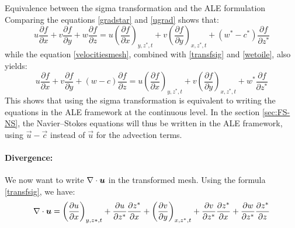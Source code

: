 \begin{CommentBlock}{Equivalence between the sigma transformation and the ALE formulation}
Comparing the equations \eqref{gradstar} and \eqref{ugrad} shows that:%
\begin{equation}
u\dfrac{\partial f}{\partial x}
+v\dfrac{\partial f}{\partial y}
+w\dfrac{\partial f}{\partial z}
= u\left(\dfrac{\partial f}{\partial x}\right)_{y,z^*,t}
+v\left(\dfrac{\partial f}{\partial y}\right)_{x,z^*,t}
+(w^{\ast}-c^{\ast})\dfrac{\partial f}{\partial z^{\ast}}
\end{equation}
while the equation \eqref{velocitiesmesh}, combined with \eqref{transfsig} and \eqref{wetoile}, also yields:%
\begin{equation}
u\dfrac{\partial f}{\partial x}
+v\dfrac{\partial f}{\partial y}
+(w-c)\dfrac{\partial f}{\partial z}
=u\left(\dfrac{\partial f}{\partial x}\right)_{y,z^*,t}
+v\left(\dfrac{\partial f}{\partial y}\right)_{x,z^*,t}
+w^{\ast}\dfrac{\partial f}{\partial z^{\ast}}
\end{equation}
This shows that using the sigma transformation is equivalent to writing the equations in the ALE framework
at the continuous level. In the section \ref{sec:FS-NS}, the Navier--Stokes
equations will thus be written in the ALE framework,
using $\vec{u}-\vec{c}$ instead of $\vec{u}$ for the advection terms.
\end{CommentBlock}

\paragraph{Divergence:%
%
}

We now want to write $\nabla \cdot \bm{u}$ in the transformed mesh. Using
the formula \eqref{transfsig}, we have:%
\begin{equation}
\nabla \cdot\bm{u}=\left(\dfrac{\partial u}{\partial x}\right)_{y,z\ast,t}
+\dfrac{\partial u}{\partial z^{\ast}}\dfrac{\partial z^{\ast}}{\partial x}
+\left(\dfrac{\partial v}{\partial y}\right)_{x,z^{\ast},t}
+\dfrac{\partial v}{\partial z^{\ast}}\dfrac{\partial z^{\ast}}{\partial x}
+\dfrac{\partial w}{\partial z^{\ast}}\dfrac{\partial z^{\ast}}{\partial z}
\end{equation}

